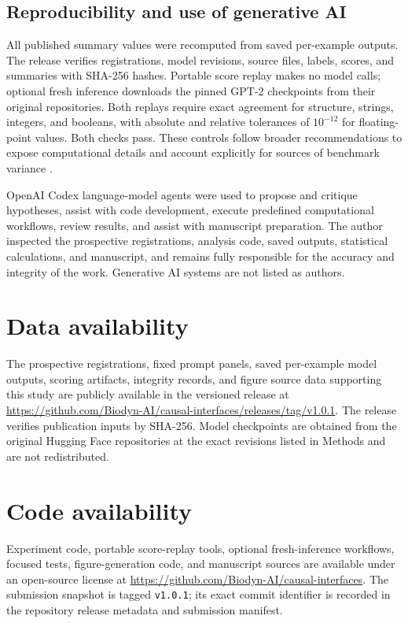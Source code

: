 \documentclass[pdflatex,sn-nature]{sn-jnl}
\begin{document}
\subsection{Reproducibility and use of generative AI}

All published summary values were recomputed from saved per-example outputs.
The release verifies registrations, model revisions, source files, labels,
scores, and summaries with SHA-256 hashes. Portable score replay makes no model
calls; optional fresh inference downloads the pinned GPT-2 checkpoints from
their original repositories. Both replays require exact agreement for
structure, strings, integers, and booleans, with absolute and relative
tolerances of $10^{-12}$ for floating-point values. Both checks pass.
These controls follow broader recommendations to expose computational details
and account explicitly for sources of benchmark variance
\citep{pineau2021improving,bouthillier2021accounting}.

OpenAI Codex language-model agents were used to propose and critique
hypotheses, assist with code development, execute predefined computational
workflows, review results, and assist with manuscript preparation. The author
inspected the prospective registrations, analysis code, saved outputs, statistical
calculations, and manuscript, and remains fully responsible for the accuracy
and integrity of the work. Generative AI systems are not listed as authors.

\section{Data availability}\label{sec:data}

The prospective registrations, fixed prompt panels, saved per-example model outputs,
scoring artifacts, integrity records, and figure source data supporting this
study are publicly available in the versioned release at
\url{https://github.com/Biodyn-AI/causal-interfaces/releases/tag/v1.0.1}.
The release verifies publication inputs by SHA-256. Model checkpoints are
obtained from the original Hugging Face repositories at the exact revisions
listed in Methods and are not redistributed.

\section{Code availability}\label{sec:code}

Experiment code, portable score-replay tools, optional fresh-inference
workflows, focused tests, figure-generation code, and manuscript sources are
available under an open-source license at
\url{https://github.com/Biodyn-AI/causal-interfaces}. The submission snapshot
is tagged \texttt{v1.0.1}; its exact commit identifier is recorded in the
repository release metadata and submission manifest.
\end{document}
